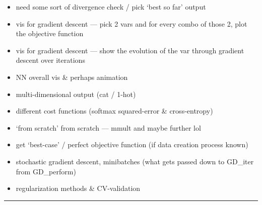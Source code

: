 \documentclass[
]{book}
\providecommand{\tightlist}{%
  \setlength{\itemsep}{0pt}\setlength{\parskip}{0pt}}
\begin{document}
\begin{itemize}
\tightlist
\item
  need some sort of divergence check / pick `best so far' output
\item
  vis for gradient descent --- pick 2 vars and for every combo of those 2, plot the objective function
\item
  vis for gradient descent --- show the evolution of the var through gradient descent over iterations
\item
  NN overall vis \& perhaps animation
\item
  multi-dimensional output (cat / 1-hot)
\item
  different cost functions (softmax squared-error \& cross-entropy)
\item
  `from scratch' from scratch --- mmult and maybe further lol
\item
  get `best-case' / perfect objective function (if data creation process known)
\item
  stochastic gradient descent, minibatches (what gets passed down to GD\_iter from GD\_perform)
\item
  regularization methods \& CV-validation
\end{itemize}

\begin{center}\rule{0.5\linewidth}{0.5pt}\end{center}
\end{document}
